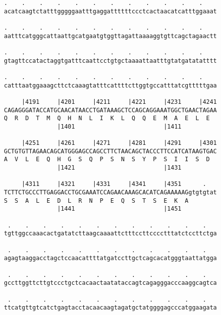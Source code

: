\documentclass{article}
\begin{document}
\begin{Verbatim}
.    .    .    .    .    .    .    .    .    .    .    .    
acatcaagtctatttgggggaatttgaggattttttccctcactaacatcatttggaaat
                                                            
.    .    .    .    .    .    .    .    .    .    .    .    
aatttcatgggcattaattgcatgaatgtggttagattaaaaggtgttcagctagaactt
                                                            
.    .    .    .    .    .    .    .    .    .    .    .    
gtagttccatactaggtgatttcaattcctgtgctaaaattaatttgtatgatatatttt
                                                            
.    .    .    .    .    .    .    .    .    .    .    .    
catttaatggaaagcttctcaaagtatttcattttcttggtgccatttatcgtttttgaa
                                                            
     |4191     |4201     |4211     |4221     |4231     |4241
CAGAGGGATACCATGCAACATAACCTGATAAAGCTCCAGCAGGAAATGGCTGAACTAGAA
Q  R  D  T  M  Q  H  N  L  I  K  L  Q  Q  E  M  A  E  L  E  
               |1401                         |1411          
  
     |4251     |4261     |4271     |4281     |4291     |4301
GCTGTGTTAGAACAGCATGGGAGCCAGCCTTCTAACAGCTACCCTTCCATCATAAGTGAC
A  V  L  E  Q  H  G  S  Q  P  S  N  S  Y  P  S  I  I  S  D  
               |1421                         |1431          
  
     |4311     |4321     |4331     |4341     |4351      .   
TCTTCTGCCCTTGAGGACCTGCGAAATCCAGAACAAAGCACATCAGAAAAAGgtgtgtat
S  S  A  L  E  D  L  R  N  P  E  Q  S  T  S  E  K  A        
               |1441                         |1451          
  
 .    .    .    .    .    .    .    .    .    .    .    .   
tgttggccaaacactgatatcttaagcaaaattctttccttcccctttatctccttctga
                                                            
 .    .    .    .    .    .    .    .    .    .    .    .   
agagtaaggacctagctccaacattttatgatccttgctcagcacatgggtaattatgga
                                                            
 .    .    .    .    .    .    .    .    .    .    .    .   
gccttggttcttgtccctgctcacaactaatataccagtcagagggacccaaggcagtca
                                                            
 .    .    .    .    .    .    .    .    .    .    .    .   
ttcatgttgtcatctgagtacctacaacaagtagatgctatggggagcccatggaagata
                                                            

\end{Verbatim}
\end{document}
